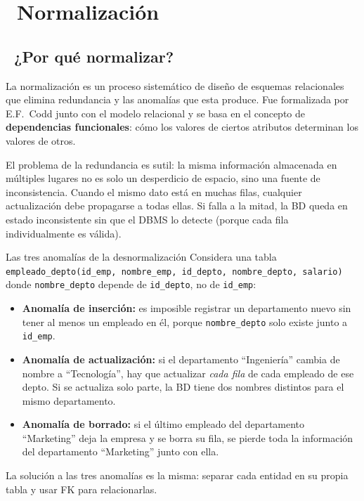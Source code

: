 \chapter[Normalización]{~Normalización}

\section[¿Por qué normalizar?]{~¿Por qué normalizar?}

La normalización es un proceso sistemático de diseño de esquemas relacionales que elimina redundancia y las anomalías que esta produce.
Fue formalizada por E.F.~Codd junto con el modelo relacional y se basa en el concepto de \textbf{dependencias funcionales}: cómo los valores de ciertos atributos determinan los valores de otros.

El problema de la redundancia es sutil: la misma información almacenada en múltiples lugares no es solo un desperdicio de espacio, sino una fuente de inconsistencia.
Cuando el mismo dato está en muchas filas, cualquier actualización debe propagarse a todas ellas.
Si falla a la mitad, la BD queda en estado inconsistente sin que el DBMS lo detecte (porque cada fila individualmente es válida).

\begin{teoriabox}{Las tres anomalías de la desnormalización}
Considera una tabla \texttt{empleado\_depto(id\_emp, nombre\_emp, id\_depto, nombre\_depto, salario)} donde \texttt{nombre\_depto} depende de \texttt{id\_depto}, no de \texttt{id\_emp}:

\begin{itemize}
  \item \textbf{Anomalía de inserción:} es imposible registrar un departamento nuevo sin tener al menos un empleado en él, porque \texttt{nombre\_depto} solo existe junto a \texttt{id\_emp}.
  \item \textbf{Anomalía de actualización:} si el departamento ``Ingeniería'' cambia de nombre a ``Tecnología'', hay que actualizar \emph{cada fila} de cada empleado de ese depto. Si se actualiza solo parte, la BD tiene dos nombres distintos para el mismo departamento.
  \item \textbf{Anomalía de borrado:} si el último empleado del departamento ``Marketing'' deja la empresa y se borra su fila, se pierde toda la información del departamento ``Marketing'' junto con ella.
\end{itemize}
La solución a las tres anomalías es la misma: separar cada entidad en su propia tabla y usar FK para relacionarlas.
\end{teoriabox}

